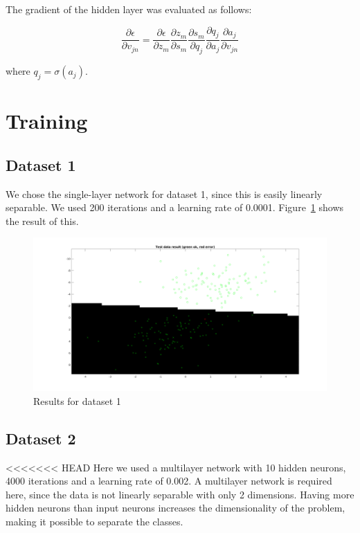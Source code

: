 \documentclass{article}
\begin{document}
The gradient of the hidden layer was evaluated as follows:

\begin{equation}
  \frac{\partial \epsilon}{\partial v_{jn}} =
  \frac{\partial \epsilon}{\partial z_m}
  \frac{\partial z_m}{\partial s_m}
  \frac{\partial s_m}{\partial q_j}
  \frac{\partial q_j}{\partial a_j}
  \frac{\partial a_j}{\partial v_{jn}}
\end{equation}

where $q_j = \sigma(a_j)$.

\section{Training}

\subsection{Dataset 1}

We chose the single-layer network for dataset 1, since this is easily
linearly separable. We used 200 iterations and a learning rate of
0.0001. Figure~\ref{fig:res1} shows the result of this.

\begin{figure}
    \label{fig:res1}
    \includegraphics[width=13cm]{dataset1res.png}
    \caption{Results for dataset 1}
\end{figure}

\subsection{Dataset 2}

<<<<<<< HEAD
Here we used a multilayer network with 10 hidden neurons, 4000
iterations and a learning rate of 0.002. A multilayer network is
required here, since the data is not linearly separable with only 2
dimensions. Having more hidden neurons than input neurons increases
the dimensionality of the problem, making it possible to separate the
classes.
\end{document}

